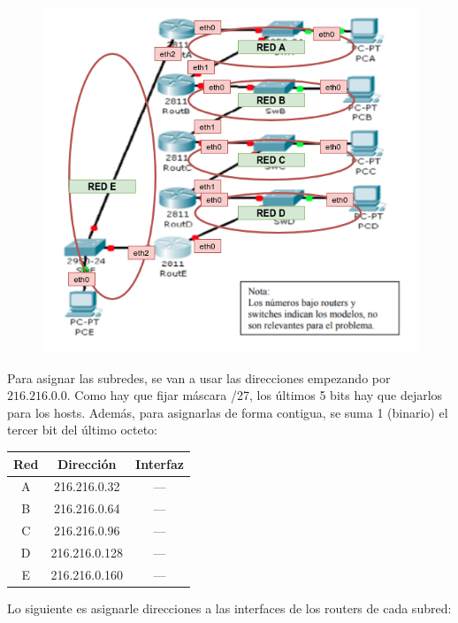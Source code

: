 \documentclass[12pt]{article}
\theoremstyle{definition}
\theoremstyle{remark}
\begin{document}
\begin{figure}[H]
   \center
  \includegraphics[scale=0.5]{img/2.png}
\end{figure}

Para asignar las subredes, se van a usar las direcciones empezando por $216.216.0.0$. Como hay que fijar máscara /27, los últimos 5 bits hay que dejarlos para los hosts. Además, para asignarlas de forma contigua, se suma 1 (binario) el tercer bit del último octeto:

\begin{center}
\begin{tabular}{|c|c|c|}
\hline 
Red & Dirección & Interfaz \\ 
\hline 
A &  216.216.0.32 & --- \\ 
\hline 
B &  216.216.0.64 & --- \\ 
\hline 
C &  216.216.0.96 & --- \\ 
\hline 
D &  216.216.0.128 & --- \\ 
\hline 
E  &  216.216.0.160 & --- \\ 
\hline 
\end{tabular} 
\end{center}

Lo siguiente es asignarle direcciones a las interfaces de los routers de cada subred:
\end{document}
